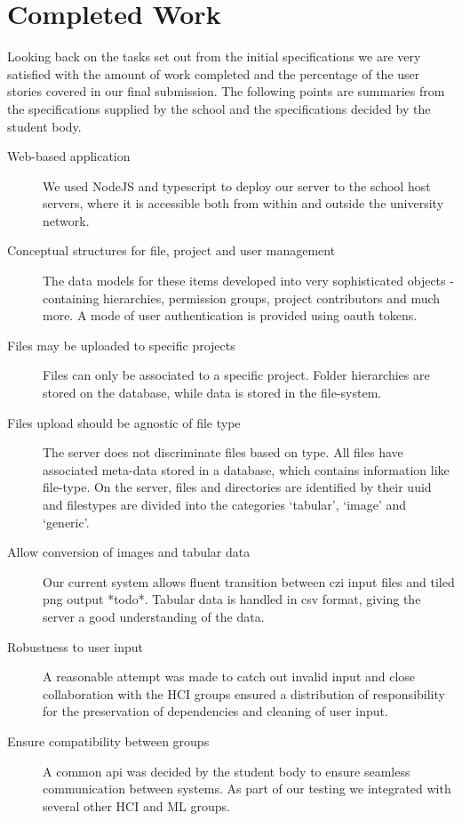 \section{Completed Work}
Looking back on the tasks set out from the initial specifications we are very satisfied with the amount of work completed and the percentage of the user stories covered in our final submission. The following points are summaries from the specifications supplied by the school and the specifications decided by the student body. 

\begin{description}
\item[Web-based application] We used NodeJS and typescript to deploy our server to the school host servers, where it is accessible both from within and outside the university network.
\item[Conceptual structures for file, project and user management] The data models for these items developed into very sophisticated objects - containing hierarchies, permission groups, project contributors and much more. A mode of user authentication is provided using oauth tokens. 
\item[Files may be uploaded to specific projects] Files can only be associated to a specific project. Folder hierarchies are stored on the database, while data is stored in the file-system.
\item[Files upload should be agnostic of file type] The server does not discriminate files based on type. All files have associated meta-data stored in a database, which contains information like file-type. On the server, files and directories are identified by their uuid and filestypes are divided into the categories `tabular', `image' and `generic'.
\item[Allow conversion of images and tabular data] Our current system allows fluent transition between czi input files and tiled png output *todo*. Tabular data is handled in csv format, giving the server a good understanding of the data.
\item[Robustness to user input] A reasonable attempt was made to catch out invalid input and close collaboration with the HCI groups ensured a distribution of responsibility for the preservation of dependencies and cleaning of user input.
\item[Ensure compatibility between groups] A common api was decided by the student body to ensure seamless communication between systems. As part of our testing we integrated with several other HCI and ML groups. 
\end{description}